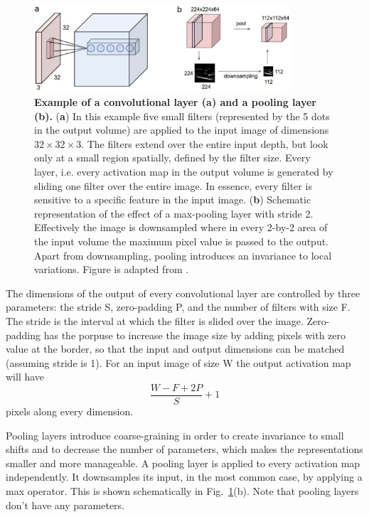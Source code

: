\begin{figure}[h!]
	\centering
	\captionsetup{width=1\linewidth}
	\includegraphics[width=0.85\textwidth]{Figures/conv_pooling.pdf}
	\caption{\textbf{Example of a convolutional layer (a) and a pooling layer (b).} (\textbf{a}) In this example five small filters (represented by the 5 dots in the output volume) are applied to the input image of dimensions $32\times32\times3$. The filters extend over the entire input depth, but look only at a small region spatially, defined by the filter size. Every layer, i.e. every activation map in the output volume is generated by sliding one filter over the entire image. In essence, every filter is sensitive to a specific feature in the input image. (\textbf{b}) Schematic representation of the effect of a max-pooling layer with stride 2. Effectively the image is downsampled where in every 2-by-2 area of the input volume the maximum pixel value is passed to the output. Apart from downsampling, pooling introduces an invariance to local variations. Figure is adapted from \parencite{cs231}.
}
	\label{fig:conv_pooling}
\end{figure}

The dimensions of the output of every convolutional layer are controlled by three parameters: the stride S, zero-padding P, and the number of filters with size F. The stride is the interval at which the filter is slided over the image. Zero-padding has the porpuse to increase the image size by adding pixels with zero value at the border, so that the input and output dimensions can be matched (assuming stride is 1). For an input image of size W the output activation map will have
\begin{equation}
\frac{W - F +2P}{S} + 1
\end{equation}
pixels along every dimension. 

Pooling layers introduce coarse-graining in order to create invariance to small shifts and to decrease the number of parameters, which makes the representations smaller and more manageable. A pooling layer is applied to every activation map independently. It downsamples its input, in the most common case, by applying a max operator. This is shown schematically in Fig.~\ref{fig:conv_pooling}(b). Note that pooling layers don't have any parameters.

